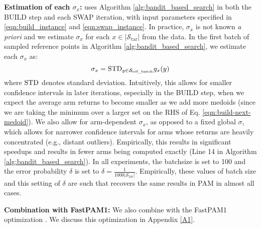 \textbf{Estimation of each $\sigma_x$:} \algname uses Algorithm \ref{alg:bandit_based_search} in both the BUILD step and each SWAP iteration, with input parameters specified in \eqref{eqn:build_instance} and \eqref{eqn:swap_instance}. In practice, $\sigma_x$ is not known \emph{a priori} and we estimate $\sigma_x$ for each $x \in |\mathcal{S}_{\text{tar}}|$ from the data. In the first batch of sampled reference points in Algorithm \ref{alg:bandit_based_search}, we estimate each $\sigma_x$ as:
\begin{equation}
\label{eqn:sigma_est}
    \sigma_x = {\rm STD}_{y \in \mathcal{S}_{\text{ref\_batch}}}g_x(y)
\end{equation}
where ${\rm STD}$ denotes standard deviation. Intuitively, this allows for smaller confidence intervals in later iterations, especially in the BUILD step, when we expect the average arm returns to become smaller as we add more medoids (since we are taking the minimum over a larger set on the RHS of Eq. \eqref{eqn:build-next-medoid}). We also allow for arm-dependent $\sigma_x$, as opposed to a fixed global $\sigma$, which allows for narrower confidence intervals for arms whose returns are heavily concentrated (e.g., distant outliers). 
Empirically, this results in significant speedups and results in fewer arms being computed exactly (Line 14 in Algorithm \ref{alg:bandit_based_search}). In all experiments, the batchsize is set to 100 and the error probability $\delta$ is set to $\delta = \frac{1}{1000\vert \mathcal{S}_{\text{tar}} \vert}$. Empirically, these values of batch size and this setting of $\delta$ are such that \algname recovers the same results in PAM in almost all cases.%


\textbf{Combination with FastPAM1:} We also combine \algname with the FastPAM1 optimization \cite{schubert2019faster}. We discuss this optimization in Appendix \ref{A1}. 




